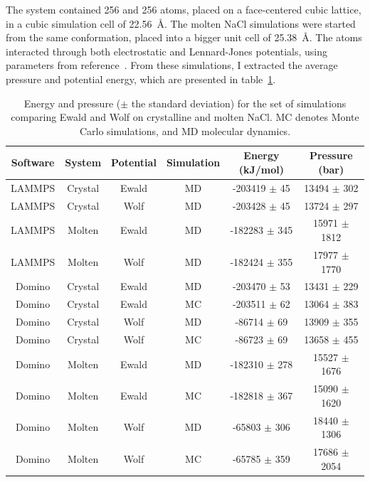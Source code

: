 \documentclass[thesis]{subfiles}
\begin{document}
The system contained 256  and 256  atoms, placed on a
face-centered cubic lattice, in a cubic simulation cell of \SI{22.56}{\AA}.  The
molten NaCl simulations were started from the same conformation, placed into a
bigger unit cell of \SI{25.38}{\AA}. The atoms interacted through both
electrostatic and Lennard-Jones potentials, using parameters from
reference~\cite{Mao2012}. From these simulations, I extracted the average
pressure and potential energy, which are presented in
table~\ref{tab:ewald-vs-wolf}.

\begin{table}[ht]
    \caption{Energy and pressure ($\pm$ the standard deviation) for the set of
    simulations comparing Ewald and Wolf on crystalline and molten NaCl. MC
    denotes Monte Carlo simulations, and MD molecular dynamics.}
    \label{tab:ewald-vs-wolf}
    \begin{tabular}{c c c c c c}
        \toprule
        Software & System  & Potential & Simulation & Energy (\si{kJ/mol}) & Pressure (bar) \\
        \midrule
        LAMMPS   & Crystal &    Ewald  &    MD      & -203419 $\pm$ 45  & 13494 $\pm$ 302  \\
        LAMMPS   & Crystal &    Wolf   &    MD      & -203428 $\pm$ 45  & 13724 $\pm$ 297  \\
        LAMMPS   & Molten  &    Ewald  &    MD      & -182283 $\pm$ 345 & 15971 $\pm$ 1812 \\
        LAMMPS   & Molten  &    Wolf   &    MD      & -182424 $\pm$ 355 & 17977 $\pm$ 1770 \\
        \midrule
        Domino   & Crystal &    Ewald  &    MD      & -203470 $\pm$ 53 & 13431 $\pm$ 229 \\
        Domino   & Crystal &    Ewald  &    MC      & -203511 $\pm$ 62 & 13064 $\pm$ 383 \\
        Domino   & Crystal &    Wolf   &    MD      & -86714 $\pm$ 69 & 13909 $\pm$ 355 \\
        Domino   & Crystal &    Wolf   &    MC      & -86723 $\pm$ 69 & 13658 $\pm$ 455 \\
        Domino   & Molten  &    Ewald  &    MD      & -182310 $\pm$ 278 & 15527 $\pm$ 1676 \\
        Domino   & Molten  &    Ewald  &    MC      & -182818 $\pm$ 367 & 15090 $\pm$ 1620 \\
        Domino   & Molten  &    Wolf   &    MD      & -65803 $\pm$ 306 & 18440 $\pm$ 1306 \\
        Domino   & Molten  &    Wolf   &    MC      & -65785 $\pm$ 359 & 17686 $\pm$ 2054 \\
        \bottomrule
    \end{tabular}
\end{table}
\end{document}
